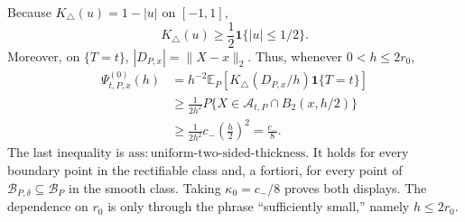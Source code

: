 Because \(K_\triangle(u)=1-|u|\) on \([-1,1]\),
\[
 K_\triangle(u)\geq\frac12\mathbf 1\{|u|\leq1/2\}.
\]
Moreover, on \(\{T=t\}\), \(|D_{P,x}|=\lVert X-x\rVert_2\).  Thus, whenever \(0<h\leq2r_0\),
\[
\begin{aligned}
 \Psi^{(0)}_{t,P,x}(h)
 &=h^{-2}\mathbb E_P\!\left[K_\triangle(D_{P,x}/h)\mathbf 1\{T=t\}\right]\\
 &\geq\frac{1}{2h^2}P\{X\in\mathcal A_{t,P}\cap B_2(x,h/2)\}\\
 &\geq\frac{1}{2h^2}c_-\left(\frac h2\right)^2
 =\frac{c_-}{8}.
\end{aligned}
\]
The last inequality is \(\mathrm{ass:uniform\text{-}two\text{-}sided\text{-}thickness}\).  It holds for every boundary point in the rectifiable class and, a fortiori, for every point of \(\mathcal B_{P,\delta}\subseteq\mathcal B_P\) in the smooth class.  Taking \(\kappa_0=c_-/8\) proves both displays.  The dependence on \(r_0\) is only through the phrase ``sufficiently small,'' namely \(h\leq2r_0\).